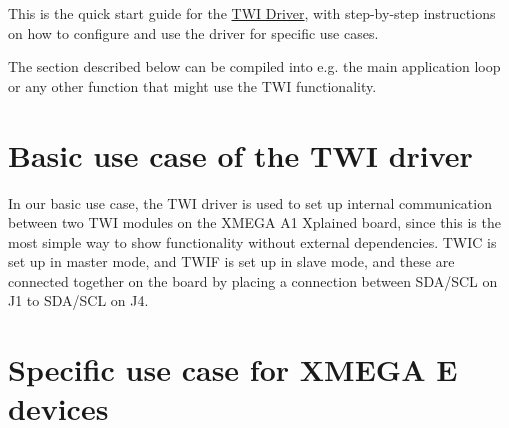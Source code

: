 This is the quick start guide for the \hyperlink{group__group__xmega__drivers__twi}{T\-W\-I Driver}, with step-\/by-\/step instructions on how to configure and use the driver for specific use cases.

The section described below can be compiled into e.\-g. the main application loop or any other function that might use the T\-W\-I functionality.\hypertarget{xmega_twi_quickstart_xmega_twi_quickstart_basic}{}\section{Basic use case of the T\-W\-I driver}\label{xmega_twi_quickstart_xmega_twi_quickstart_basic}
In our basic use case, the T\-W\-I driver is used to set up internal communication between two T\-W\-I modules on the X\-M\-E\-G\-A A1 Xplained board, since this is the most simple way to show functionality without external dependencies. T\-W\-I\-C is set up in master mode, and T\-W\-I\-F is set up in slave mode, and these are connected together on the board by placing a connection between S\-D\-A/\-S\-C\-L on J1 to S\-D\-A/\-S\-C\-L on J4.\hypertarget{xmega_twi_quickstart_xmega_twi_qs_use_cases}{}\section{Specific use case for X\-M\-E\-G\-A E devices}\label{xmega_twi_quickstart_xmega_twi_qs_use_cases}

